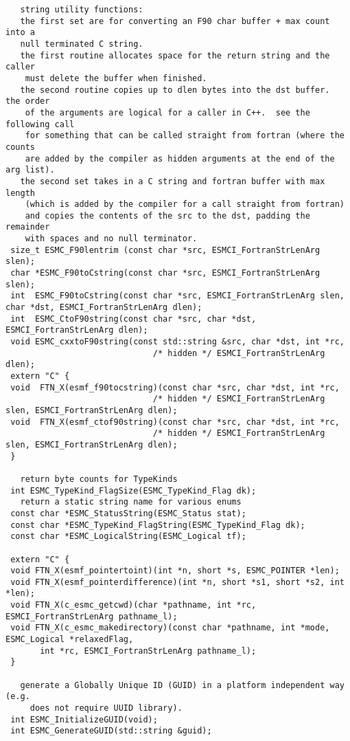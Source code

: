 \begin{verbatim}
   string utility functions:
   the first set are for converting an F90 char buffer + max count into a 
   null terminated C string.  
   the first routine allocates space for the return string and the caller
    must delete the buffer when finished.
   the second routine copies up to dlen bytes into the dst buffer.  the order
    of the arguments are logical for a caller in C++.  see the following call
    for something that can be called straight from fortran (where the counts
    are added by the compiler as hidden arguments at the end of the arg list).
   the second set takes in a C string and fortran buffer with max length
    (which is added by the compiler for a call straight from fortran)
    and copies the contents of the src to the dst, padding the remainder
    with spaces and no null terminator.
 size_t ESMC_F90lentrim (const char *src, ESMCI_FortranStrLenArg slen);
 char *ESMC_F90toCstring(const char *src, ESMCI_FortranStrLenArg slen);
 int  ESMC_F90toCstring(const char *src, ESMCI_FortranStrLenArg slen, char *dst, ESMCI_FortranStrLenArg dlen);
 int  ESMC_CtoF90string(const char *src, char *dst, ESMCI_FortranStrLenArg dlen);
 void ESMC_cxxtoF90string(const std::string &src, char *dst, int *rc, 
                              /* hidden */ ESMCI_FortranStrLenArg dlen);
 extern "C" {
 void  FTN_X(esmf_f90tocstring)(const char *src, char *dst, int *rc, 
                              /* hidden */ ESMCI_FortranStrLenArg slen, ESMCI_FortranStrLenArg dlen);
 void  FTN_X(esmf_ctof90string)(const char *src, char *dst, int *rc, 
                              /* hidden */ ESMCI_FortranStrLenArg slen, ESMCI_FortranStrLenArg dlen);
 }
 
   return byte counts for TypeKinds
 int ESMC_TypeKind_FlagSize(ESMC_TypeKind_Flag dk);
   return a static string name for various enums
 const char *ESMC_StatusString(ESMC_Status stat);
 const char *ESMC_TypeKind_FlagString(ESMC_TypeKind_Flag dk);
 const char *ESMC_LogicalString(ESMC_Logical tf);
 
 extern "C" {
 void FTN_X(esmf_pointertoint)(int *n, short *s, ESMC_POINTER *len);
 void FTN_X(esmf_pointerdifference)(int *n, short *s1, short *s2, int *len);
 void FTN_X(c_esmc_getcwd)(char *pathname, int *rc, ESMCI_FortranStrLenArg pathname_l);
 void FTN_X(c_esmc_makedirectory)(const char *pathname, int *mode, ESMC_Logical *relaxedFlag,
       int *rc, ESMCI_FortranStrLenArg pathname_l);
 }
 
   generate a Globally Unique ID (GUID) in a platform independent way (e.g.
     does not require UUID library).
 int ESMC_InitializeGUID(void);
 int ESMC_GenerateGUID(std::string &guid);
 

\end{verbatim}
